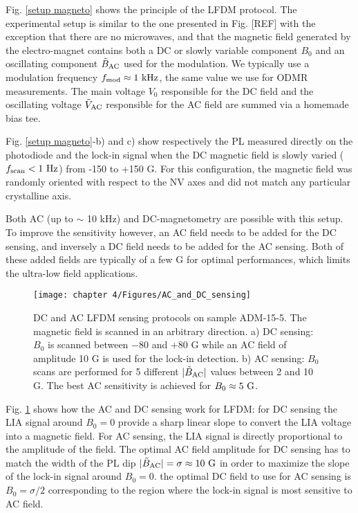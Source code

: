 \documentclass[a4paper,11pt]{report}
\begin{document}
\begin{refsection}
Fig. \ref{setup magneto} shows the principle of the LFDM protocol. The experimental setup is similar to the one presented in Fig. [REF] with the exception that there are no microwaves, and that the magnetic field generated by the electro-magnet contains both a DC or slowly variable component $B_0$ and an oscillating component $\tilde{B}_{\rm AC}$ used for the modulation. We typically use a modulation frequency $f_{\rm mod} \approx 1\ \rm kHz$, the same value we use for ODMR measurements. The main voltage $V_0$ responsible for the DC field and the oscillating voltage $\tilde{V}_{\rm AC}$ responsible for the AC field are summed via a homemade bias tee.

Fig. \ref{setup magneto}-b) and c) show respectively the PL measured directly on the photodiode and the lock-in signal when the DC magnetic field is slowly varied ($f_{\rm scan}<1\ \rm Hz$) from -150 to +150 G. For this configuration, the magnetic field was randomly oriented with respect to the NV axes and did not match any particular crystalline axis.

Both AC (up to $\sim$ 10 kHz) and DC-magnetometry are possible with this setup. To improve the sensitivity however, an AC field needs to be added for the DC sensing, and inversely a DC field needs to be added for the AC sensing. Both of these added fields are typically of a few G for optimal performances, which limits the ultra-low field applications.

\begin{figure}[h!]
\centering
\texttt{[image: chapter 4/Figures/AC\_and\_DC\_sensing]}
\caption{DC and AC LFDM sensing protocols on sample ADM-15-5. The magnetic field is scanned in an arbitrary direction. a) DC sensing: $B_0$ is scanned between $-$80 and +80 G while an AC field of amplitude 10 G is used for the lock-in detection. b) AC sensing: $B_0$ scans are performed for 5 different $|\tilde B_{\rm AC}|$ values between 2 and 10 G. The best AC sensitivity is achieved for $B_0\approx 5\ \rm G$.}
\label{AC and DC sensing}
\end{figure}

Fig. \ref{AC and DC sensing} shows how the AC and DC sensing work for LFDM: for DC sensing the LIA signal around $B_0=0$ provide a sharp linear slope to convert the LIA voltage into a magnetic field. For AC sensing, the LIA signal is directly proportional to the amplitude of the field. The optimal AC field amplitude for DC sensing has to match the width of the PL dip $|\tilde{B}_{\rm AC}| = \sigma \approx 10\ \rm G$ in order to maximize the slope of the lock-in signal around $B_0=0$. the optimal DC field to use for AC sensing is $B_0= \sigma/2$ corresponding to the region where the lock-in signal is most sensitive to AC field. 


\end{refsection}
\end{document}
